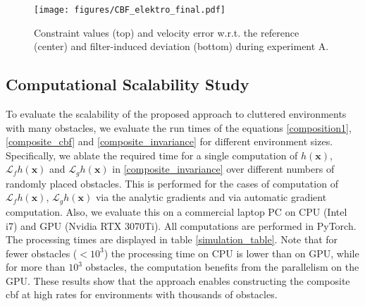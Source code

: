 \begin{figure}
    \centering
    \texttt{[image: figures/CBF\_elektro\_final.pdf]}
    \vspace{-6ex}
    \caption{\small Constraint values (top) and velocity error w.r.t. the reference (center) and filter-induced deviation (bottom) during experiment A.}
    \label{fig:CBF_elektro}
    \vspace{-3ex}
\end{figure}

\subsection{Computational Scalability Study}
To evaluate the scalability of the proposed approach to cluttered environments with many obstacles, we evaluate the run times of the equations \eqref{composition1}, \eqref{composite_cbf} and \eqref{composite_invariance} for different environment sizes. Specifically, we ablate the required time for a single computation of $h(\mathbf{x})$, $\mathcal{L}_f h(\mathbf{x})$ and $\mathcal{L}_g h(\mathbf{x})$ in \eqref{composite_invariance} over different numbers of randomly placed obstacles. This is performed for the cases of computation of $\mathcal{L}_f h(\mathbf{x})$, $\mathcal{L}_g h(\mathbf{x})$ via the analytic gradients and via automatic gradient computation. Also, we evaluate this on a commercial laptop PC on CPU (Intel i7) and GPU (Nvidia RTX 3070Ti). All computations are performed in PyTorch. The processing times are displayed in table \ref{simulation_table}. Note that for fewer obstacles ($<10^3$) the processing time on CPU is lower than on GPU, while for more than $10^3$ obstacles, the computation benefits from the parallelism on the GPU.
These results show that the approach enables constructing the composite \ac{cbf} at high rates for environments with thousands of obstacles.

